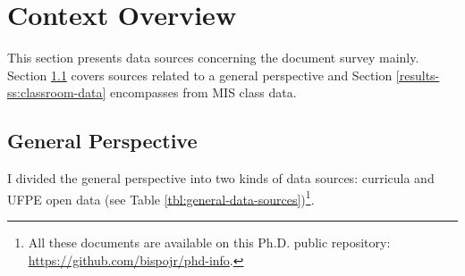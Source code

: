 \section{Context Overview}
\label{res-sec:context-overview}

This section presents data sources concerning the document survey mainly. Section \ref{results-ss:general-overview} covers sources related to a general perspective and Section \ref{results-ss:classroom-data} encompasses from \gls{MIS} class data.

\subsection{General Perspective}
\label{results-ss:general-overview}

I divided the general perspective into two kinds of data sources: curricula and \acrfull{UFPE} open data (see Table \ref{tbl:general-data-sources})\footnote{All these documents are available on this \gls{Ph.D.} public repository: \url{https://github.com/bispojr/phd-info}.}.

